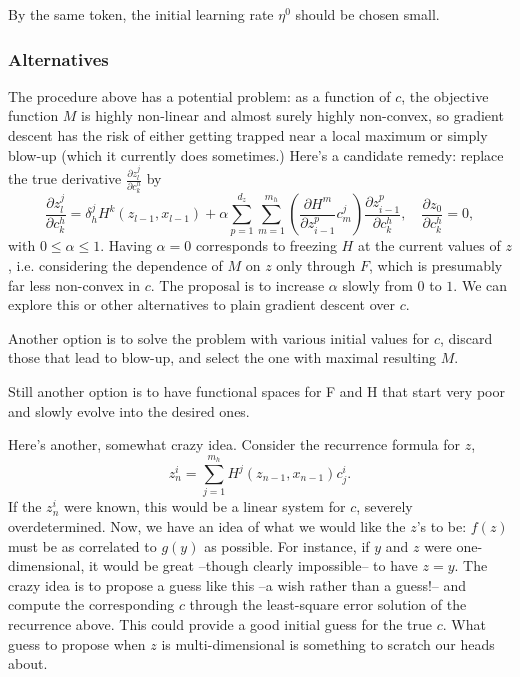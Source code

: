 \documentclass[a4paper,11pt]{article}
\theoremstyle{definition}
\begin{document}
\begin{enumerate}
By the same token, the initial learning rate $\eta^0$ should be chosen small.




\subsubsection{Alternatives}


The procedure above has a potential problem: as a function of $c$, the objective function $M$ is highly non-linear and almost surely highly non-convex, so gradient descent has the risk of either getting trapped near a local maximum or simply blow-up (which it currently does sometimes.) Here's a candidate remedy: replace the true derivative $ \frac{\partial z^j_l}{\partial c_{k}^h}$ by
%
$$ \frac{\partial z^j_l}{\partial c_{k}^h} = \delta_h^j H^k\left(z_{l-1}, x_{l-1} \right) + \alpha \sum_{p=1}^{d_z} \sum_{m=1}^{m_h} \left(\frac{\partial H^m}{\partial z^p_{i-1}}  c^j_m \right) \frac{\partial z^p_{i-1}}{\partial c_{k}^h} ,
\quad \frac{\partial z_0}{\partial c_{k}^h} = 0 ,$$
%
with $0 \le \alpha \le 1$. Having $\alpha = 0$ corresponds to freezing $H$ at the current values of $z$, i.e. considering the dependence of $M$ on $z$ only through $F$, which is presumably far less non-convex in $c$. The proposal is to increase $\alpha$ slowly from $0$ to $1$. We can explore this or other alternatives to plain gradient descent over $c$.


Another option is to solve the problem with various initial values for $c$, discard those that lead to blow-up, and select the one with maximal resulting $M$.


Still another option is to have functional spaces for F and H that start very poor and slowly evolve into the desired ones.


Here's another, somewhat crazy idea. Consider the recurrence formula for $z$,
%
$$ z_{n}^i = \sum_{j=1}^{m_h} H^j\left(z_{n-1}, x_{n-1}\right) c_j^i. $$
%
If the $z_n^i$ were known, this would be a linear system for $c$, severely overdetermined. Now, we have an idea of what we would like the $z$'s to be: $f(z)$ must be as correlated to $g(y)$ as possible. For instance, if $y$ and $z$ were one-dimensional, it would be great --though clearly impossible-- to have $z = y$. The crazy idea is to propose a guess like this --a wish rather than a guess!-- and compute the corresponding $c$ through the least-square error solution of the recurrence above. This could provide a good initial guess for the true $c$. What guess to propose when $z$ is multi-dimensional is something to scratch our heads about.



\end{enumerate}
\end{document}
